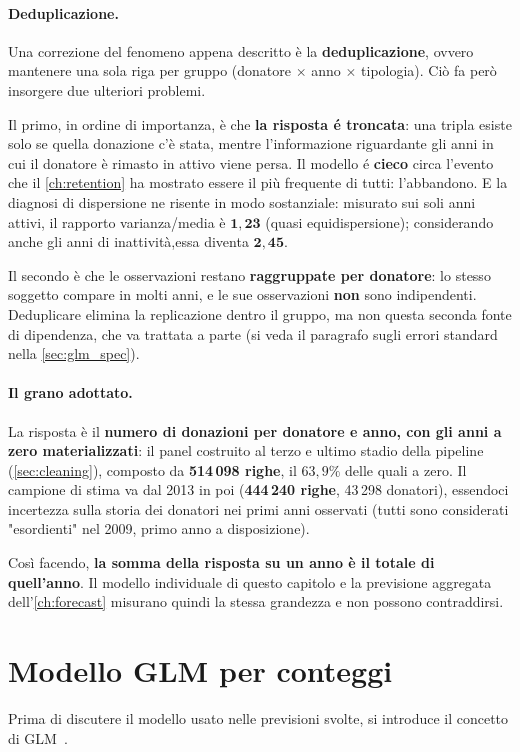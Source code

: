 \paragraph{Deduplicazione.}
Una correzione del fenomeno appena descritto è la \textbf{deduplicazione}, ovvero
mantenere una sola riga per gruppo (donatore $\times$ anno $\times$ tipologia).
Ciò fa però insorgere due ulteriori problemi.

Il primo, in ordine di importanza, è che \textbf{la risposta é troncata}: una tripla
esiste solo se quella donazione c'è stata, mentre l'informazione riguardante
gli anni in cui il donatore è rimasto in attivo viene persa. Il modello é
\textbf{cieco} circa l'evento che il \cref{ch:retention} ha mostrato essere il più
frequente di tutti: l'abbandono. E la diagnosi di dispersione ne risente in
modo sostanziale: misurato sui soli anni attivi, il rapporto varianza/media è
$\mathbf{1{,}23}$ (quasi equidispersione); considerando anche gli anni di
inattività,essa diventa $\mathbf{2{,}45}$.

Il secondo è che le osservazioni restano \textbf{raggruppate per donatore}: lo
stesso soggetto compare in molti anni, e le sue osservazioni \textbf{non} sono
indipendenti. Deduplicare elimina la replicazione dentro il gruppo, ma non
questa seconda fonte di dipendenza, che va trattata a parte (si veda il
paragrafo sugli errori standard nella \cref{sec:glm_spec}).

\paragraph{Il grano adottato.}
La risposta è il \textbf{numero di donazioni per donatore e anno, con gli anni
a zero materializzati}: il panel costruito al terzo e ultimo stadio della pipeline
(\cref{sec:cleaning}), composto da \textbf{514\,098 righe}, il $63{,}9\%$ delle quali a
zero. Il campione di stima va dal 2013 in poi
(\textbf{444\,240 righe}, 43\,298 donatori), essendoci incertezza sulla storia dei donatori
nei primi anni osservati (tutti sono considerati "esordienti" nel 2009, primo anno a disposizione).

Così facendo, \textbf{la somma della
risposta su un anno è il totale di quell'anno}. Il modello individuale di
questo capitolo e la previsione aggregata dell'\cref{ch:forecast} misurano
quindi la stessa grandezza e non possono contraddirsi.

\section{Modello GLM per conteggi}
\label{sec:glm_model}
Prima di discutere il modello usato nelle previsioni svolte, si introduce il concetto di
GLM~\cite{McCullaghNelder1989}.

